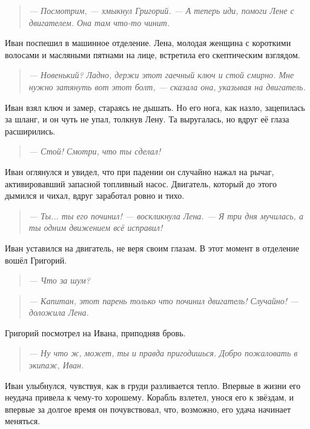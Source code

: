 \documentclass[12pt,a4paper]{book}
\newenvironment{dialogue}{\begin{quote}\itshape}{\end{quote}} %
\begin{document}
\begin{dialogue}
--- Посмотрим, --- хмыкнул Григорий. --- А теперь иди, помоги Лене с двигателем. Она там что-то чинит.
\end{dialogue}

Иван поспешил в машинное отделение. Лена, молодая женщина с короткими волосами и масляными пятнами на лице, встретила его скептическим взглядом.

\begin{dialogue}
--- Новенький? Ладно, держи этот гаечный ключ и стой смирно. Мне нужно затянуть вот этот болт, --- сказала она, указывая на двигатель.
\end{dialogue}

Иван взял ключ и замер, стараясь не дышать. Но его нога, как назло, зацепилась за шланг, и он чуть не упал, толкнув Лену. Та выругалась, но вдруг её глаза расширились.

\begin{dialogue}
--- Стой! Смотри, что ты сделал!
\end{dialogue}

Иван оглянулся и увидел, что при падении он случайно нажал на рычаг, активировавший запасной топливный насос. Двигатель, который до этого дымился и чихал, вдруг заработал ровно и тихо.

\begin{dialogue}
--- Ты... ты его починил! --- воскликнула Лена. --- Я три дня мучилась, а ты одним движением всё исправил!
\end{dialogue}

Иван уставился на двигатель, не веря своим глазам. В этот момент в отделение вошёл Григорий.

\begin{dialogue}
--- Что за шум?
\end{dialogue}

\begin{dialogue}
--- Капитан, этот парень только что починил двигатель! Случайно! --- доложила Лена.
\end{dialogue}

Григорий посмотрел на Ивана, приподняв бровь.

\begin{dialogue}
--- Ну что ж, может, ты и правда пригодишься. Добро пожаловать в экипаж, Иван.
\end{dialogue}

Иван улыбнулся, чувствуя, как в груди разливается тепло. Впервые в жизни его неудача привела к чему-то хорошему. Корабль взлетел, унося его к звёздам, и впервые за долгое время он почувствовал, что, возможно, его удача начинает меняться.
\end{document}
